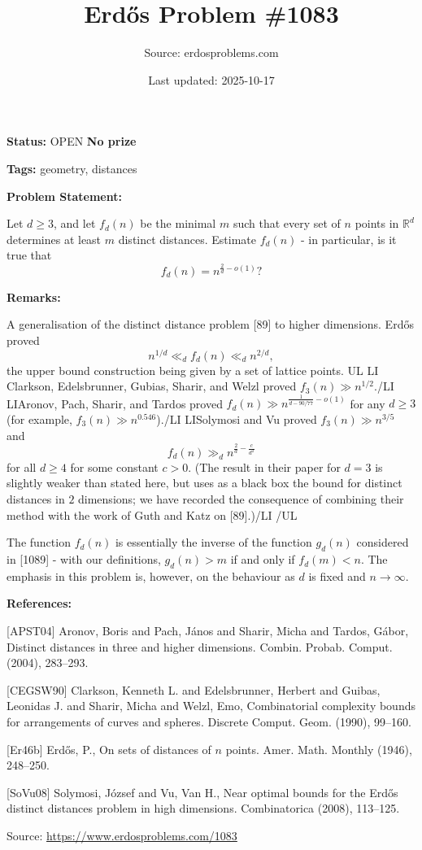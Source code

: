\documentclass{article}
\title{Erd\H{o}s Problem \#1083}
\date{Last updated: 2025-10-17}
\author{Source: erdosproblems.com}
\begin{document}
\maketitle

\noindent\textbf{Status:} OPEN \quad \textbf{No prize}

\noindent\textbf{Tags:} geometry, distances

\medskip
\noindent\textbf{Problem Statement:}

Let $d\geq 3$, and let $f_d(n)$ be the minimal $m$ such that every set of $n$ points in $\mathbb{R}^d$ determines at least $m$ distinct distances. Estimate $f_d(n)$ - in particular, is it true that\[f_d(n)=n^{\frac{2}{d}-o(1)}?\]

\bigskip
\noindent\textbf{Remarks:}

A generalisation of the distinct distance problem [89] to higher dimensions. Erd\H{o}s \cite{Er46b} proved\[n^{1/d}\ll_d f_d(n)\ll_d n^{2/d},\]the upper bound construction being given by a set of lattice points.
{UL}
{LI} Clarkson, Edelsbrunner, Gubias, Sharir, and Welzl \cite{CEGSW90} proved $f_3(n)\gg n^{1/2}$.{/LI}
{LI}Aronov, Pach, Sharir, and Tardos \cite{APST04} proved $f_d(n)\gg n^{\frac{1}{d-90/77}-o(1)}$ for any $d\geq 3$ (for example, $f_3(n)\gg n^{0.546}$).{/LI}
{LI}Solymosi and Vu \cite{SoVu08} proved $f_3(n) \gg n^{3/5}$ and\[ f_d(n)\gg_d n^{\frac{2}{d}-\frac{c}{d^2}}\]for all $d\geq 4$ for some constant $c>0$. (The result in their paper for $d=3$ is slightly weaker than stated here, but uses as a black box the bound for distinct distances in $2$ dimensions; we have recorded the consequence of combining their method with the work of Guth and Katz on [89].){/LI}
{/UL}

The function $f_d(n)$ is essentially the inverse of the function $g_d(n)$ considered in [1089] - with our definitions, $g_d(n)>m$ if and only if $f_d(m)<n$. The emphasis in this problem is, however, on the behaviour as $d$ is fixed and $n\to \infty$.

\bigskip
\noindent\textbf{References:}

[APST04] Aronov, Boris and Pach, J\'{a}nos and Sharir, Micha and Tardos,
G\'{a}bor, Distinct distances in three and higher dimensions. Combin. Probab. Comput. (2004), 283--293.
 
 [CEGSW90] Clarkson, Kenneth L. and Edelsbrunner, Herbert and Guibas,
Leonidas J. and Sharir, Micha and Welzl, Emo, Combinatorial complexity bounds for arrangements of curves and
spheres. Discrete Comput. Geom. (1990), 99--160.
 
 [Er46b] Erd\H{o}s, P., On sets of distances of {$n$} points. Amer. Math. Monthly (1946), 248--250.
 
 [SoVu08] Solymosi, J\'ozsef and Vu, Van H., Near optimal bounds for the {E}rd\H{o}s distinct distances
problem in high dimensions. Combinatorica (2008), 113--125.

\bigskip
\noindent\small{Source: \url{https://www.erdosproblems.com/1083}}
\end{document}
